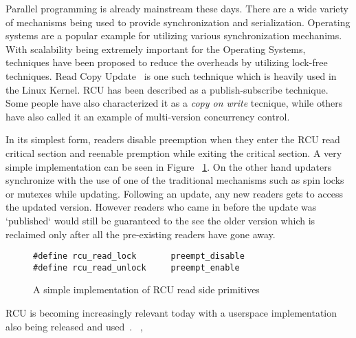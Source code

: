 Parallel programming is already mainstream these days. There are a wide variety
of mechanisms being used to provide synchronization and serialization.
Operating systems are a popular example for utilizing various synchronization
mechanims. %
With scalability being extremely important for the Operating Systems,
techniques have been proposed to reduce the overheads by utilizing lock-free
techniques. Read Copy Update~\cite{paulmck:TechReport} is one such technique which is
heavily used in the Linux Kernel. RCU has been described as a publish-subscribe
technique. Some people have also characterized it as a \emph{copy on write} tecnique, while
others have also called it an example of multi-version concurrency control.

In its simplest form, readers disable preemption when they enter the RCU read critical
section and reenable premption while exiting the
critical section. A very simple implementation can be seen in Figure ~\ref{fig:rcusimpleread}.
On the other hand updaters synchronize with the use
of one of the traditional mechanisms such as spin locks or mutexes while updating.
Following an update, any new readers gets to access the updated version. However
readers who came in before the update was `published` would still be guaranteed
to the see the older version which is reclaimed only after all the pre-existing
readers have gone away.

\begin{figure}[b]
\centering
\begin{lstlisting}
#define rcu_read_lock		preempt_disable
#define rcu_read_unlock		preempt_enable
\end{lstlisting}
\caption{A simple implementation of RCU read side primitives}\label{fig:rcusimpleread}
\end{figure}

RCU is becoming increasingly relevant today with a userspace implementation also
being released and used~\cite{urcu}.%
~\cite{goulet:thesis},~\cite{urcu-crowd}


